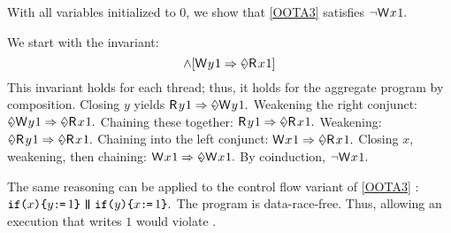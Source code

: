 \begin{example}
\label{ex:thin}
With all variables initialized to $0$, we show that \ref{OOTA3}
satisfies
\begin{math}
  \lnot\DW{x}{1}.
\end{math}

We start with the invariant:
\begin{displaymath}
  [\DW{x}{1}\Rightarrow\once\DR{y}{1}]
  \land
  [\DW{y}{1}\Rightarrow\once\DR{x}{1}]
\end{displaymath}
This invariant holds for each thread; thus, it holds for the
aggregate program by composition.  Closing $y$ yields
\begin{math}
  \DR{y}{1} \Rightarrow \once\DW{y}{1}.
\end{math}
Weakening the right conjunct: %
\begin{math}
  \once\DW{y}{1}\Rightarrow\once\DR{x}{1}.
\end{math}
Chaining these together: %
\begin{math}
  \DR{y}{1} \Rightarrow \once\DR{x}{1}.
\end{math}
Weakening:  %
\begin{math}
  \once\DR{y}{1} \allowbreak\Rightarrow \once\DR{x}{1}. 
\end{math}
Chaining into the left conjunct:  %
\begin{math}
  \DW{x}{1} \Rightarrow \once\DR{x}{1}. 
\end{math}
Closing $x$, 
weakening, 
then chaining: %
\begin{math}
  \DW{x}{1} \Rightarrow \once\DW{x}{1}. 
\end{math}
By coinduction, 
\begin{math}
  \lnot\DW{x}{1}.
\end{math}
\end{example}

The same reasoning can be applied to the control flow variant of \ref{OOTA3}
\cite[CYC]{DBLP:conf/popl/VafeiadisBCMN15}:
\begin{math}
  \IF{x}\THEN y\GETS 1 \FI \!\PAR\! \IF{y}\THEN x\GETS 1 \FI.
\end{math}
The program is data-race-free. Thus, allowing an execution that writes $1$
would violate \drfsc{}.

